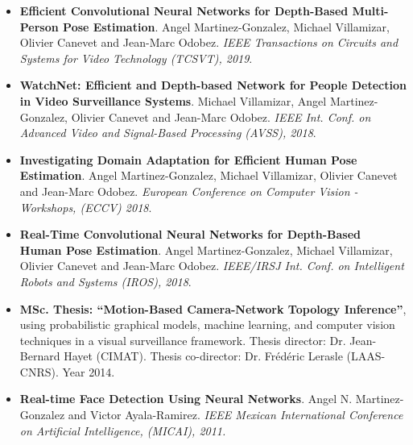 \documentclass[10 pt]{article}
\begin{document}
\begin{itemize}[noitemsep]

\item \textbf{Efficient Convolutional Neural Networks for Depth-Based Multi-Person Pose Estimation}. 
Angel Martinez-Gonzalez, Michael Villamizar, Olivier Canevet and Jean-Marc Odobez.
\textit{IEEE Transactions on Circuits and Systems for Video Technology (TCSVT), 2019}.
\vspace{.05cm}
%

\item \textbf{WatchNet: Efficient and Depth-based Network for People Detection in Video Surveillance Systems}.
Michael Villamizar, Angel Martinez-Gonzalez, Olivier Canevet and Jean-Marc Odobez.
\textit{IEEE Int. Conf. on Advanced Video and Signal-Based Processing (AVSS), 2018}.
\vspace{.05cm}
%

\item  \textbf{Investigating Domain Adaptation for Efficient Human Pose Estimation}.
Angel Martinez-Gonzalez, Michael Villamizar, Olivier Canevet and Jean-Marc Odobez.
\textit{European Conference on Computer Vision - Workshops, (ECCV) 2018}.
\vspace{.05cm}

\item \textbf{Real-Time Convolutional Neural Networks for Depth-Based Human Pose Estimation}.
Angel Martinez-Gonzalez, Michael Villamizar, Olivier Canevet and Jean-Marc Odobez.
\textit{IEEE/IRSJ Int. Conf. on Intelligent Robots and Systems (IROS), 2018}.
\vspace{.05cm}

\item \textbf{MSc. Thesis: “Motion-Based Camera-Network Topology Inference”}, using probabilistic graphical models, machine learning, and computer 
vision techniques in a visual surveillance framework. Thesis director: Dr. Jean-Bernard Hayet (CIMAT). 
Thesis co-director: Dr. Frédéric Lerasle (LAAS-CNRS). Year 2014.
\vspace{.05cm}
%

\item \textbf{Real-time Face Detection Using Neural Networks}. 
Angel N. Martinez-Gonzalez and Victor Ayala-Ramirez. 
\textit{IEEE Mexican International Conference on Artificial Intelligence, (MICAI), 2011.}
\vspace{.05cm}

\end{itemize}
%
%
\end{document}

